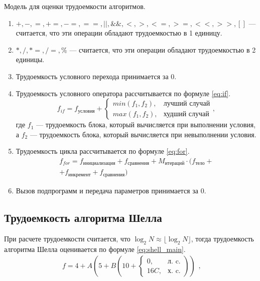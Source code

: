 Модель для оценки трудоемкости алгоритмов.
\begin{enumerate}
	\item $+, -, =, +=, -=, ==, ||, \&\&, <, >, <=, >=, <<, >>, []$ --- считается, что эти операции обладают трудоемкостью в 1 единицу.
	\item $*, /, *=, /=, \% $ --- считается, что эти операции обладают трудоемкостью в 2 единицы.
	\item Трудоемкость условного перехода принимается за $0$.
	\item Трудоемкость условного оператора рассчитывается по формуле \eqref{eq:if}. 
	\begin{equation}
		\label{eq:if}
		f_{if} = f_{\text{условия}} + 
		\begin{cases}
			min(f_1, f_2), & \text{лучший случай}\\
			max(f_1, f_2), & \text{худший случай}
		\end{cases},
	\end{equation}
	где $f_1$ --- трудоемкость блока, который вычисляется при выполнении условия, а $f_2$ --- трудоемкость блока, который вычисляется при невыполнении условия.
	\item Трудоемкость цикла рассчитывается по формуле \eqref{eq:for}.
	\begin{equation}
		\label{eq:for}
		\begin{gathered}
			f_{for} = f_{\text{инициализация}} + f_{\text{сравнения}} + M_{\text{итераций}} \cdot (f_{\text{тело}} +\\
			+ f_{\text{инкремент}} + f_{\text{сравнения}})
		\end{gathered}
	\end{equation}
	\item Вызов подпрограмм и передача параметров принимается за $0$.
\end{enumerate}

\subsection{Трудоемкость алгоритма Шелла}

При расчете трудоемкости считается, что $\log_{2}N \approx \lfloor \log_{2}N \rfloor$, тогда трудоемкость алгоритма Шелла оценивается по формуле \eqref{eq:shell_main}.
\begin{equation}
	\label{eq:shell_main}
	\begin{gathered}
		f = 4 + A (5 + B(10 + \begin{cases}
			0, & \text{л.~c.}\\
			16 C, & \text{х.~c.}
		\end{cases}))
	\end{gathered},
\end{equation}


